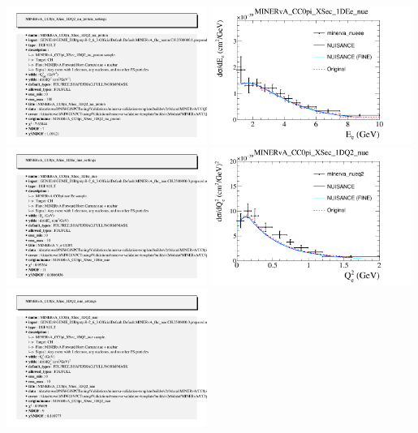 \documentclass{article}
\begin{document}
\includegraphics[width=0.49\textwidth]{figures/minerva_cc0pi1p_2015_info.png}
\centering
\includegraphics[width=0.49\textwidth]{figures/minerva_nueee_comp.png}
\includegraphics[width=0.49\textwidth]{figures/minerva_nueee_info.png}
\centering
\includegraphics[width=0.49\textwidth]{figures/minerva_nueq2_comp.png}
\includegraphics[width=0.49\textwidth]{figures/minerva_nueq2_info.png}
\end{document}
